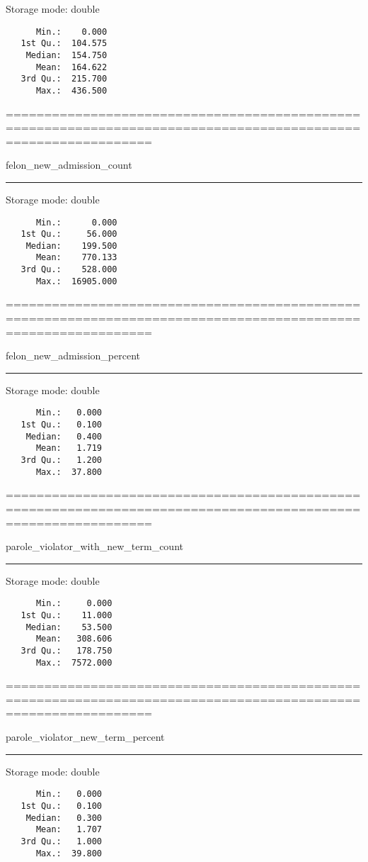 \documentclass[]{article}
\begin{document}
Storage mode: double

\begin{verbatim}
      Min.:    0.000  
   1st Qu.:  104.575  
    Median:  154.750  
      Mean:  164.622  
   3rd Qu.:  215.700  
      Max.:  436.500  
\end{verbatim}

===============================================================================================================

felon\_new\_admission\_count

\begin{center}\rule{0.5\linewidth}{\linethickness}\end{center}

Storage mode: double

\begin{verbatim}
      Min.:      0.000  
   1st Qu.:     56.000  
    Median:    199.500  
      Mean:    770.133  
   3rd Qu.:    528.000  
      Max.:  16905.000  
\end{verbatim}

===============================================================================================================

felon\_new\_admission\_percent

\begin{center}\rule{0.5\linewidth}{\linethickness}\end{center}

Storage mode: double

\begin{verbatim}
      Min.:   0.000  
   1st Qu.:   0.100  
    Median:   0.400  
      Mean:   1.719  
   3rd Qu.:   1.200  
      Max.:  37.800  
\end{verbatim}

===============================================================================================================

parole\_violator\_with\_new\_term\_count

\begin{center}\rule{0.5\linewidth}{\linethickness}\end{center}

Storage mode: double

\begin{verbatim}
      Min.:     0.000  
   1st Qu.:    11.000  
    Median:    53.500  
      Mean:   308.606  
   3rd Qu.:   178.750  
      Max.:  7572.000  
\end{verbatim}

===============================================================================================================

parole\_violator\_new\_term\_percent

\begin{center}\rule{0.5\linewidth}{\linethickness}\end{center}

Storage mode: double

\begin{verbatim}
      Min.:   0.000  
   1st Qu.:   0.100  
    Median:   0.300  
      Mean:   1.707  
   3rd Qu.:   1.000  
      Max.:  39.800  
\end{verbatim}
\end{document}
